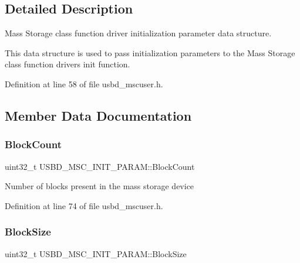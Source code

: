 \subsection{Detailed Description}
Mass Storage class function driver initialization parameter data structure. 

This data structure is used to pass initialization parameters to the Mass Storage class function driver\textquotesingle{}s init function. 

Definition at line 58 of file usbd\+\_\+mscuser.\+h.



\subsection{Member Data Documentation}
\mbox{\label{struct_u_s_b_d___m_s_c___i_n_i_t___p_a_r_a_m_a88951ad7bc026318e18eadf372804caa}} 
\subsubsection{\texorpdfstring{Block\+Count}{BlockCount}}
{\footnotesize\ttfamily uint32\+\_\+t U\+S\+B\+D\+\_\+\+M\+S\+C\+\_\+\+I\+N\+I\+T\+\_\+\+P\+A\+R\+A\+M\+::\+Block\+Count}

Number of blocks present in the mass storage device 

Definition at line 74 of file usbd\+\_\+mscuser.\+h.

\mbox{\label{struct_u_s_b_d___m_s_c___i_n_i_t___p_a_r_a_m_af0ed8a5b4aec5f19e1b15c1ab3c3dcbd}} 
\subsubsection{\texorpdfstring{Block\+Size}{BlockSize}}
{\footnotesize\ttfamily uint32\+\_\+t U\+S\+B\+D\+\_\+\+M\+S\+C\+\_\+\+I\+N\+I\+T\+\_\+\+P\+A\+R\+A\+M\+::\+Block\+Size}


